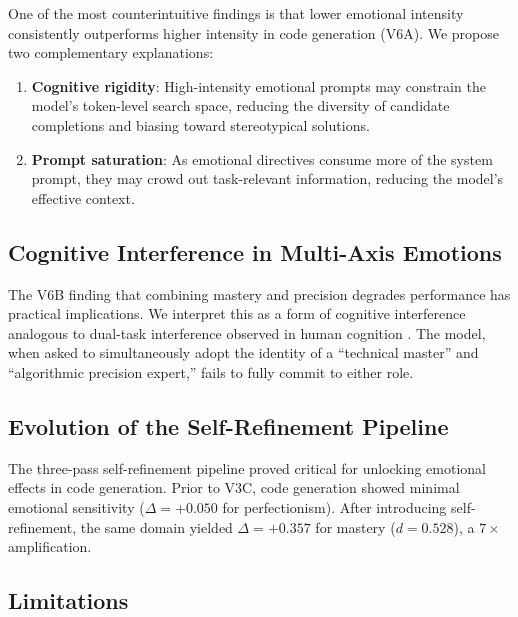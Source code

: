 \documentclass[lineno]{wlpeerj}
\begin{document}
One of the most counterintuitive findings is that lower emotional intensity consistently outperforms higher intensity in code generation (V6A). We propose two complementary explanations:

\begin{enumerate}
    \item \textbf{Cognitive rigidity}: High-intensity emotional prompts may constrain the model's token-level search space, reducing the diversity of candidate completions and biasing toward stereotypical solutions.
    \item \textbf{Prompt saturation}: As emotional directives consume more of the system prompt, they may crowd out task-relevant information, reducing the model's effective context.
\end{enumerate}

\subsection{Cognitive Interference in Multi-Axis Emotions}

The V6B finding that combining mastery and precision degrades performance has practical implications. We interpret this as a form of cognitive interference analogous to dual-task interference observed in human cognition \citep{kahneman2011thinking}. The model, when asked to simultaneously adopt the identity of a ``technical master'' and ``algorithmic precision expert,'' fails to fully commit to either role.

\subsection{Evolution of the Self-Refinement Pipeline}

The three-pass self-refinement pipeline proved critical for unlocking emotional effects in code generation. Prior to V3C, code generation showed minimal emotional sensitivity ($\Delta = +0.050$ for perfectionism). After introducing self-refinement, the same domain yielded $\Delta = +0.357$ for mastery ($d = 0.528$), a $7\times$ amplification.

\subsection{Limitations}
\end{document}
